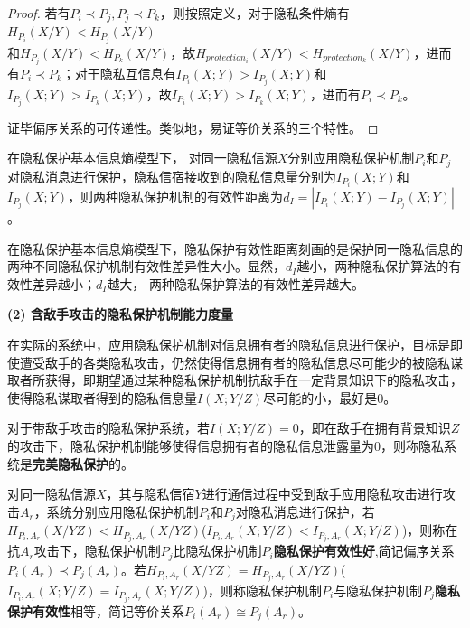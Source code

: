 \begin{proof}
	若有$P_{i}\prec P_{j},P_{j}\prec P_{k}$，则按照定义，对于隐私条件熵有$H_{P_{i}}(X/Y)< H_{P_{j}}(X/Y)$\\和$H_{P_{j}}(X/Y)< H_{P_{k}}(X/Y)$，故$H_{protection_{i}}(X/Y)< H_{protection_{k}}(X/Y)$，进而有$P_{i}\prec P_{k}$；对于隐私互信息有$I_{P_{i}}(X;Y)>I_{P_{j}}(X;Y)$和$I_{P_{j}}(X;Y)>I_{P_{k}}(X;Y)$，故$I_{P_{i}}(X;Y)>I_{P_{k}}(X;Y)$，进而有$P_{i}\prec P_{k}$。
	
	证毕偏序关系的可传递性。类似地，易证等价关系的三个特性。
\end{proof}


\begin{definition}[隐私保护有效性距离]
	\label{def:privacy-preserving-distance} 
	在隐私保护基本信息熵模型下， 对同一隐私信源$X$分别应用隐私保护机制$P_{i}$和$P_{j}$对隐私消息进行保护，隐私信宿接收到的隐私信息量分别为$I_{P_{i}}(X;Y)$和$I_{P_{j}}(X;Y)$，则两种隐私保护机制的有效性距离为$d_{I}=\left | I_{P_{i}}(X;Y)-I_{P_{j}}(X;Y) \right |$。
\end{definition}

在隐私保护基本信息熵模型下，隐私保护有效性距离刻画的是保护同一隐私信息的两种不同隐私保护机制有效性差异性大小。显然，$d_{I}$越小，两种隐私保护算法的有效性差异越小；$d_{I}$越大， 两种隐私保护算法的有效性差异越大。

\textbf{(2) 含敌手攻击的隐私保护机制能力度量}

在实际的系统中，应用隐私保护机制对信息拥有者的隐私信息进行保护，目标是即使遭受敌手的各类隐私攻击，仍然使得信息拥有者的隐私信息尽可能少的被隐私谋取者所获得，即期望通过某种隐私保护机制抗敌手在一定背景知识下的隐私攻击，使得隐私谋取者得到的隐私信息量$I(X;Y/Z)$尽可能的小，最好是0。

\begin{definition}
	\label{def:perfect-privacy-preserving}
	 对于带敌手攻击的隐私保护系统，若$I(X;Y/Z)=0$，即在敌手在拥有背景知识$Z$的攻击下，隐私保护机制能够使得信息拥有者的隐私信息泄露量为0，则称隐私系统是\textbf{完美隐私保护}的。
\end{definition}


\begin{definition}
	\label{def:privacy-preserving-performance}
	对同一隐私信源$X$，其与隐私信宿$Y$进行通信过程中受到敌手应用隐私攻击进行攻击$A_{r}$，系统分别应用隐私保护机制$P_{i}$和$P_{j}$对隐私消息进行保护，若$H_{P_{i},A_{r}}(X/YZ)<H_{P_{j},A_{r}}(X/YZ)$($I_{P_{i},A_{r}}(X;Y/Z)<I_{P_{j},A_{r}}(X;Y/Z)$)，则称在抗$A_{r}$攻击下，隐私保护机制$P_{j}$比隐私保护机制$P_{i}$\textbf{隐私保护有效性好},简记偏序关系$P_{i}(A_{r})\prec P_{j}(A_{r})$。若$H_{P_{i},A_{r}}(X/YZ)=H_{P_{j},A_{r}}(X/YZ)$($I_{P_{i},A_{r}}(X;Y/Z)=I_{P_{j},A_{r}}(X;Y/Z)$)，则称隐私保护机制$P_{i}$与隐私保护机制$P_{j}$\textbf{隐私保护有效性}相等，简记等价关系$P_{i}(A_{r})\cong P_{j}(A_{r})$。
\end{definition}

